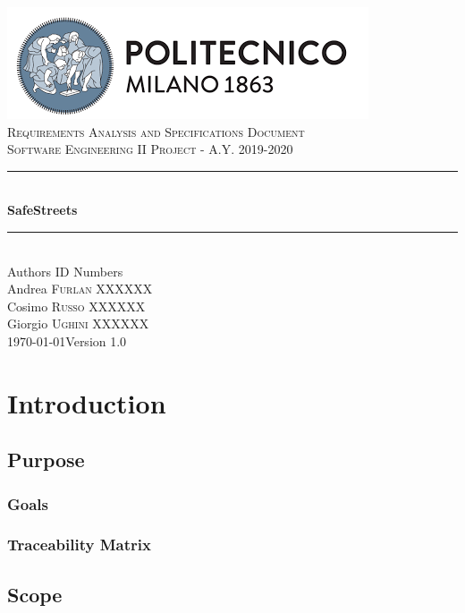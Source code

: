 \documentclass[12pt]{article}
\begin{document}
	\begin{titlepage}
		\newcommand{\HRule}{\rule{\linewidth}{0.7mm}}
		\center
		\includegraphics{PolimiLogo.png}\\[1cm]
		
		\textsc{\LARGE Requirements Analysis and Specifications Document}\\[1cm]
		\textsc{\large Software Engineering II Project - A.Y. 2019-2020}\\[1cm]
		\HRule \\[0.4cm]
		{ \huge \bfseries SafeStreets}\\[0.15cm]
		\HRule \\[1.5cm]
		{\large Authors  \hfill ID Numbers}\\[0.4cm]
		{\large Andrea \textsc{Furlan}  \hfill XXXXXX}\\[0.2cm]
		{\large Cosimo \textsc{Russo}  \hfill XXXXXX}\\[0.2cm]
		{\large Giorgio \textsc{Ughini} \hfill XXXXXX}\\[2cm]
		{\large \today  \hfill Version 1.0}
		\vfill
	\end{titlepage}
	\clearpage
	{\hypersetup{hidelinks}\tableofcontents}
	\clearpage
	\section{Introduction}
	\subsection{Purpose}
	
	\newpage
	\subsubsection{Goals}
	
	\vfill
	\subsubsection{Traceability Matrix}
	
	\newpage
	\subsection{Scope}
	
\end{document}
